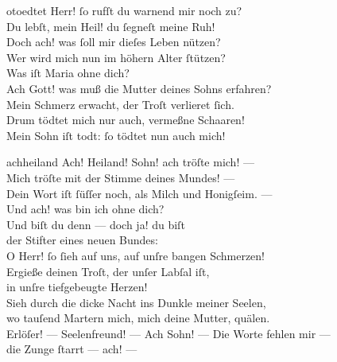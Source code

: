 \documentclass[shorttitlesize=50,tocstyle=ref-genre]{ees}
\begin{document}
{\begin{movement}{otoedtet}
    \voice[Maria]
    Herr! ſo rufſt du warnend mir noch zu?\\
    Du lebſt, mein Heil! du ſegneſt meine Ruh!\\
    Doch ach! was ſoll mir dieſes Leben nützen?\\
    Wer wird mich nun im höhern Alter ſtützen?\\
    Was iſt Maria ohne dich?\\
    Ach Gott! was muß die Mutter deines Sohns erfahren?\\
    Mein Schmerz erwacht, der Troſt verlieret ſich.\\
    Drum tödtet mich nur auch, vermeßne Schaaren!\\
    Mein Sohn iſt todt: ſo tödtet nun auch mich!
  \end{movement}

  \begin{movement}{achheiland}
    \voice[Maria]
    Ach! Heiland! Sohn! ach tröſte mich! —\\
    Mich tröſte mit der Stimme deines Mundes! —\\
    Dein Wort iſt ſüſſer noch, als Milch und Honigſeim. —\\
    Und ach! was bin ich ohne dich?\\
    Und biſt du denn — doch ja! du biſt\\
    der Stifter eines neuen Bundes:\\
    O Herr! ſo ſieh auf uns, auf unſre bangen Schmerzen!\\
    Ergieße deinen Troſt, der unſer Labſal iſt,\\
    in unſre tiefgebeugte Herzen!\\
    Sieh durch die dicke Nacht ins Dunkle meiner Seelen,\\
    wo tauſend Martern mich, mich deine Mutter, quälen.\\
    Erlöſer! — Seelenfreund! — Ach Sohn! — Die Worte fehlen mir —\\
    die Zunge ſtarrt — ach! —


\end{movement}}
\end{document}
